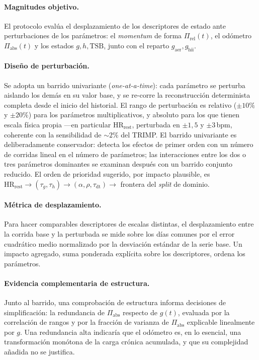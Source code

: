 \documentclass[11pt,a4paper]{article}
\begin{document}
\paragraph{Magnitudes objetivo.} El protocolo evalúa el desplazamiento de los descriptores de estado ante perturbaciones de los parámetros: el \emph{momentum} de forma $\Pi_{\mathrm{rel}}(t)$, el odómetro $\Pi_{\mathrm{abs}}(t)$ y los estados $g,h,\mathrm{TSB}$, junto con el reparto $g_{\mathrm{aer}},g_{\mathrm{hii}}$.

\paragraph{Diseño de perturbación.} Se adopta un barrido univariante (\emph{one-at-a-time}): cada parámetro se perturba aislando los demás en su valor base, y se re-corre la reconstrucción determinista completa desde el inicio del historial. El rango de perturbación es relativo ($\pm10\%$ y $\pm20\%$) para los parámetros multiplicativos, y absoluto para los que tienen escala física propia —en particular $\mathrm{HR}_{\mathrm{rest}}$, perturbada en $\pm1{,}5$ y $\pm3$\,bpm, coherente con la sensibilidad de $\sim2\%$ del TRIMP. El barrido univariante es deliberadamente conservador: detecta los efectos de primer orden con un número de corridas lineal en el número de parámetros; las interacciones entre los dos o tres parámetros dominantes se examinan después con un barrido conjunto reducido. El orden de prioridad sugerido, por impacto plausible, es $\mathrm{HR}_{\mathrm{rest}} \to (\tau_g,\tau_h) \to (\alpha,\rho,\tau_{\mathrm{dt}}) \to$ frontera del \emph{split} de dominio.

\paragraph{Métrica de desplazamiento.} Para hacer comparables descriptores de escalas distintas, el desplazamiento entre la corrida base y la perturbada se mide sobre los días comunes por el error cuadrático medio normalizado por la desviación estándar de la serie base. Un impacto agregado, suma ponderada explícita sobre los descriptores, ordena los parámetros.

\paragraph{Evidencia complementaria de estructura.} Junto al barrido, una comprobación de estructura informa decisiones de simplificación: la redundancia de $\Pi_{\mathrm{abs}}$ respecto de $g(t)$, evaluada por la correlación de rangos y por la fracción de varianza de $\Pi_{\mathrm{abs}}$ explicable linealmente por $g$. Una redundancia alta indicaría que el odómetro es, en lo esencial, una transformación monótona de la carga crónica acumulada, y que su complejidad añadida no se justifica.
\end{document}
